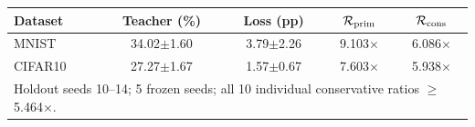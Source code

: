 {\small\begin{tabular}{lcccc}\hline
Dataset & Teacher (\%) & Loss (pp) & $\mathcal{R}_{\rm prim}$ & $\mathcal{R}_{\rm cons}$ \\
\hline
MNIST & 34.02$\pm$1.60 & 3.79$\pm$2.26 & 9.103$\times$ & 6.086$\times$ \\
CIFAR10 & 27.27$\pm$1.67 & 1.57$\pm$0.67 & 7.603$\times$ & 5.938$\times$ \\
\hline\multicolumn{5}{l}{\footnotesize Holdout seeds 10--14; 5 frozen seeds; all 10 individual conservative ratios $\ge$ 5.464$\times$.}\\
\end{tabular}}
